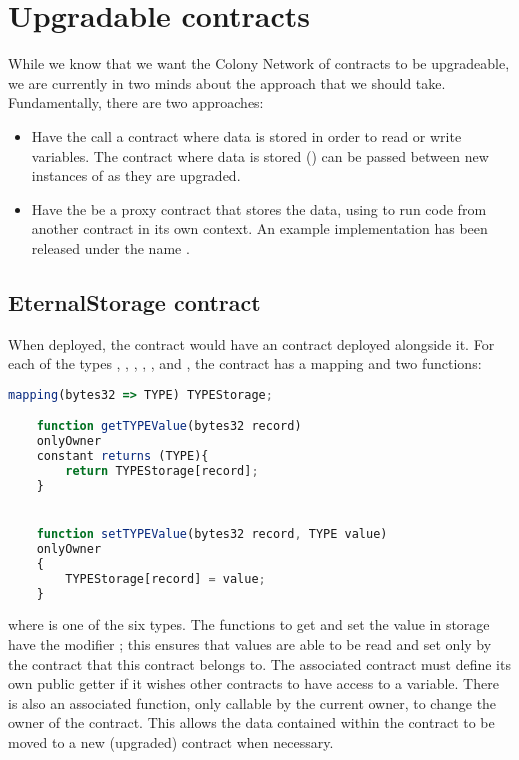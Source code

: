 \clearpage
\section{Upgradable contracts}

While we know that we want the Colony Network of contracts to be upgradeable, we are currently in two minds about the approach that we should take. Fundamentally, there are two approaches:

\begin{itemize}
    \item Have the  call a contract where data is stored in order to read or write variables. The contract where data is stored () can be passed between new instances of  as they are upgraded.
    \item Have the  be a proxy contract that stores the data, using  to run code from another contract in its own context. An example implementation has been released under the name  \cite{EtherRouter}.
\end{itemize}


\subsection {EternalStorage contract}

When deployed, the   contract would have an  contract deployed alongside it. For each of the types , , , , , and , the  contract has a mapping and two functions:

\begin{minipage}[c]{0.9\linewidth}
\begin{lstlisting}[language=JavaScript]
    mapping(bytes32 => TYPE) TYPEStorage;

    function getTYPEValue(bytes32 record)
    onlyOwner 
    constant returns (TYPE){
        return TYPEStorage[record];
    }


    function setTYPEValue(bytes32 record, TYPE value)
    onlyOwner
    {
        TYPEStorage[record] = value;
    }
\end{lstlisting}
\end{minipage}

\noindent where  is one of the six types. The functions to get and set the value in storage have the modifier ; this ensures that values are able to be read and set only by the contract that this  contract belongs to. The associated contract must define its own public getter if it wishes other contracts to have access to a variable. There is also an associated  function, only callable by the current owner, to change the owner of the contract. This allows the data contained within the contract to be moved to a new (upgraded) contract when necessary. 

